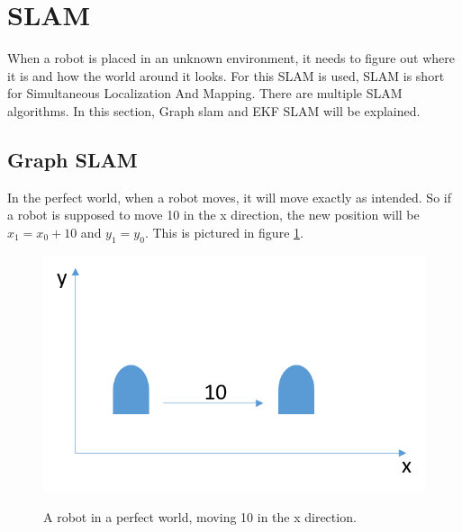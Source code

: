 \section{SLAM}
When a robot is placed in an unknown environment, it needs to figure out where it is and how the world around it looks. For this SLAM is used, SLAM is short for Simultaneous Localization And Mapping. 
There are multiple SLAM algorithms. In this section, Graph slam and EKF SLAM will be explained.

\subsection{Graph SLAM}
In the perfect world, when a robot moves, it will move exactly as intended. So if a robot is supposed to move 10 in the x direction, the new position will be $x_1 = x_0 + 10$ and $y_1 = y_0$. This is pictured in figure \ref{GraphSLAM01}.
\begin{figure}[h!]
  \caption{A robot in a perfect world, moving 10 in the x direction.}
    \includegraphics{billeder/GraphSLAM01.png} \label{GraphSLAM01}
\end{figure}

